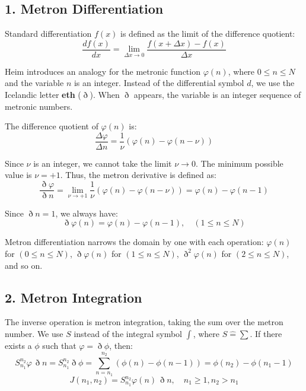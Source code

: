 \documentclass[11pt,a4paper,oneside]{article}
\begin{document}
\subsection{1. Metron Differentiation}

Standard differentiation $f(x)$ is defined as the limit of the difference quotient:
\begin{equation*}
    \frac{df(x)}{dx} = \lim_{\Delta x \to 0} \frac{f(x+\Delta x) - f(x)}{\Delta x}
\end{equation*}

Heim introduces an analogy for the metronic function $\varphi(n)$, where $0 \le n \le N$ and the variable $n$ is an integer. Instead of the differential symbol $d$, we use the Icelandic letter \textbf{eth} ($\eth$). When $\eth$ appears, the variable is an integer sequence of metronic numbers.

The difference quotient of $\varphi(n)$ is:
\begin{equation*}
    \frac{\Delta \varphi}{\Delta n} = \frac{1}{\nu}(\varphi(n) - \varphi(n-\nu))
\end{equation*}

Since $\nu$ is an integer, we cannot take the limit $\nu \to 0$. The minimum possible value is $\nu = +1$. Thus, the metron derivative is defined as:
\begin{equation*}
    \frac{\eth \varphi}{\eth n} = \lim_{\nu \to +1} \frac{1}{\nu}(\varphi(n) - \varphi(n-\nu)) = \varphi(n) - \varphi(n-1)
\end{equation*}

Since $\eth n = 1$, we always have:
\begin{equation}
    \eth \varphi(n) = \varphi(n) - \varphi(n-1), \quad (1 \le n \le N)
\end{equation}

Metron differentiation narrows the domain by one with each operation: $\varphi(n)$ for $(0 \le n \le N)$, $\eth \varphi(n)$ for $(1 \le n \le N)$, $\eth^2 \varphi(n)$ for $(2 \le n \le N)$, and so on.

\subsection{2. Metron Integration}

The inverse operation is metron integration, taking the sum over the metron number. We use $S$ instead of the integral symbol $\int$, where $S \widehat{=} \sum$. If there exists a $\phi$ such that $\varphi = \eth \phi$, then:
\begin{equation*}
    S_{n_1}^{n_2} \varphi \, \eth n = S_{n_1}^{n_2} \eth \phi = \sum_{n=n_1}^{n_2} (\phi(n) - \phi(n-1)) = \phi(n_2) - \phi(n_1-1)
\end{equation*}
\begin{equation}
    J(n_1, n_2) = S_{n_1}^{n_2} \varphi(n) \, \eth n, \quad n_1 \ge 1, n_2 > n_1 \tag{M2a}
\end{equation}
\end{document}
